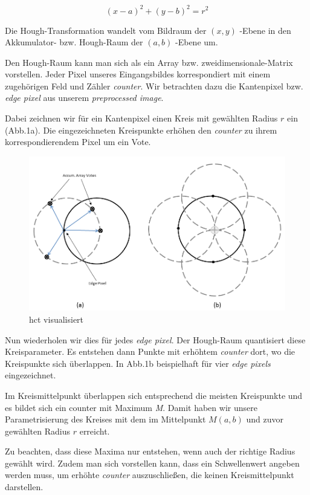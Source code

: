 \documentclass[12pt, a4paper]{scrartcl}
\begin{document}
\[(x-a)^2+(y-b)^2=r^2\]

Die Hough-Transformation wandelt vom Bildraum der \((x,y)\) -Ebene in den Akkumulator- bzw. Hough-Raum der \((a,b)\) -Ebene um. \newline

Den Hough-Raum kann man sich als ein Array bzw. zweidimensionale-Matrix vorstellen. Jeder Pixel unseres Eingangsbildes korrespondiert mit einem zugehörigen Feld und Zähler \emph{counter}. Wir betrachten dazu die Kantenpixel bzw. \emph{edge pixel} aus unserem \emph{preprocessed image}.

Dabei zeichnen wir für ein Kantenpixel einen Kreis mit gewählten Radius \(r\) ein (Abb.1a). Die eingezeichneten Kreispunkte erhöhen den \emph{counter} zu ihrem korrespondierendem Pixel um ein Vote.

\begin{figure}[h]
\includegraphics[width=\textwidth]{imfc}
\centering
\caption{\acl{hct} visualisiert}
\end{figure}

Nun wiederholen wir dies für jedes \emph{edge pixel}. Der Hough-Raum quantisiert diese Kreisparameter. Es entstehen dann Punkte mit erhöhtem \emph{counter} dort, wo die Kreispunkte sich überlappen. In Abb.1b beispielhaft für vier \emph{edge pixels} eingezeichnet.\newline

Im Kreismittelpunkt überlappen sich entsprechend die meisten Kreispunkte und es bildet sich ein counter mit Maximum \emph{M}. Damit haben wir unsere Parametrisierung des Kreises mit dem im Mittelpunkt \(M(a,b)\) und zuvor gewählten Radius \(r\) erreicht.\newline

Zu beachten, dass diese Maxima nur entstehen, wenn auch der richtige Radius gewählt wird. Zudem man sich vorstellen kann, dass ein Schwellenwert angeben werden muss, um erhöhte \emph{counter} auszuschließen, die keinen Kreismittelpunkt darstellen.\newline
\end{document}
